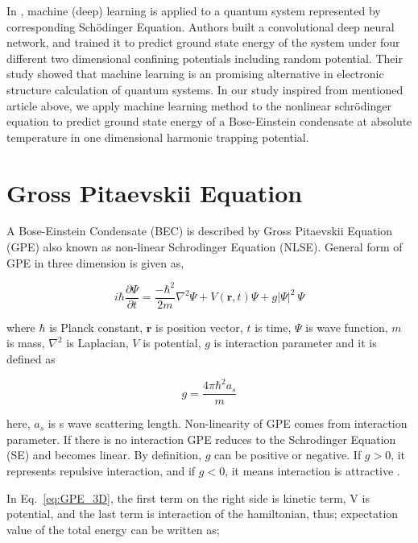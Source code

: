 \documentclass[a4paper,times,12pt]{article}
\begin{document}
In \cite{mills2017deep}, machine (deep) learning is applied to a quantum system represented by corresponding Sch{\"o}dinger Equation. Authors built a convolutional deep neural network, and trained it to predict ground state energy of the system under four different two dimensional confining potentials including random potential. Their study showed that machine learning is an promising alternative in electronic structure calculation of quantum systems. In our study inspired from mentioned article above, we apply machine learning method to the nonlinear schr{\"o}dinger equation to predict ground state energy of a Bose-Einstein condensate at absolute temperature in one dimensional harmonic trapping potential.


\section{Gross Pitaevskii Equation}

A Bose-Einstein Condensate (BEC) is described by Gross Pitaevskii Equation (GPE) also known as non-linear Schrodinger Equation (NLSE). General form of GPE in three dimension is given as,

\begin{equation}
\label{eq:GPE_3D}
i \hbar \frac {\partial \Psi}{\partial t} = \frac {-\hbar^2}{2m}\nabla^2
\Psi + V(\boldsymbol{r}, t)\Psi + g|\Psi|^2\ \Psi
\end{equation}

\noindent where $\hbar$ is Planck constant, $\boldsymbol{r}$ is position vector, $t$ is time, $\Psi$ is wave function, $m$ is mass, $\nabla^2$ is Laplacian, $V$ is potential, $g$ is interaction parameter and it is defined as 

\begin{equation}
\label{eq:GPE_inter_param}
g=\frac{4\pi\hbar^2a_s}{m}
\end{equation}

\noindent here, $a_s$ is s wave scattering length. Non-linearity of GPE comes from interaction parameter. If there is no interaction GPE reduces to the Schrodinger Equation (SE) and becomes linear. By definition, $g$ can be positive or negative. If $g > 0$, it represents repulsive interaction, and if $g < 0$, it means interaction is attractive \cite{barenghi2016primer}.

In Eq.~\ref{eq:GPE_3D}, the first term on the right side is kinetic term, V is potential, and the last term is interaction of the hamiltonian, thus; expectation value of the total energy can be written as;
\end{document}

